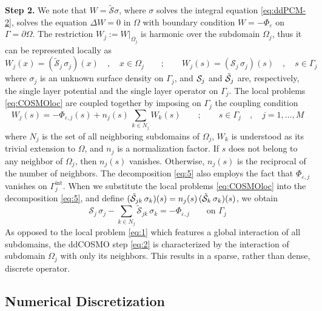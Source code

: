 {\bf Step 2.} 
We note that $W = \tilde{\mathcal{S}}\sigma$, where $\sigma$ solves the integral equation \eqref{eq:ddPCM-2}, solves the equation $\Delta W = 0$ in $\Omega$ with boundary condition $W=-\Phi_\varepsilon$ on $\Gamma=\partial \Omega$. 
The restriction $W_j := W |_{\overline{\Omega}_j}$ is harmonic over the subdomain $\Omega_j$, thus it can be represented  locally as 
\begin{equation}\label{eq:COSMOloc}
W_j(x) = (\tilde{\mathcal{S}}_j \,  \sigma_j) (x) \quad , \quad x \in \Omega_j \qquad ; \qquad
W_j(s) = (\mathcal{S}_j \,  \sigma_j) (s) \quad , \quad s \in \Gamma_j
\end{equation}
where $\sigma_j$ is an unknown surface density on $\Gamma_j$, and $\mathcal{S}_j$ and $\tilde{\mathcal{S}}_j$ are, respectively, the single layer potential and the single layer operator on $\Gamma_j$. The local problems \eqref{eq:COSMOloc} are coupled together by imposing on $\Gamma_j$ the coupling condition
\begin{equation}\label{eq:5}
W_j(s) = - \Phi_{\varepsilon,j}(s) +  n_j(s) \, \sum_{k \in N_j} {W}_k(s) \qquad ; \qquad s \in \Gamma_j \quad , \quad j = 1, \ldots , M
\end{equation}
where $N_j$ is the set of all neighboring subdomains of $\Omega_j$, $W_k$ is understood as its trivial extension to $\Omega$, and $n_j$ is a normalization factor. If $s$ does not belong to any neighbor of $\Omega_j$, then $n_j(s)$ vanishes. Otherwise, $n_j(s)$ is the reciprocal of the number of neighbors. The decomposition \eqref{eq:5} also employs the fact that $\Phi_{\varepsilon,j}$ vanishes on $\Gamma_j^\text{int}$. When we substitute the local problems \eqref{eq:COSMOloc} into the decomposition \eqref{eq:5}, and define $(\tilde{\mathcal{S}}_{jk} \, \sigma_k) (s) = n_j(s) \, (\tilde{\mathcal{S}}_k \, \sigma_k)(s)$, we obtain
\begin{equation}\label{eq:2}
\mathcal{S}_j \, \sigma_j  -  \sum_{k \in N_j} \tilde{\mathcal{S}}_{jk} \, \sigma_k = -  \Phi_{\varepsilon,j} \qquad \text{on } \Gamma_j
\end{equation}
As opposed to the local problem \eqref{eq:1} which features a global interaction of all subdomains, the ddCOSMO step \eqref{eq:2} is characterized by the interaction of subdomain $\Omega_j$ with only its neighbors. This results in a sparse, rather than dense, discrete operator.

\subsection{Numerical Discretization}

